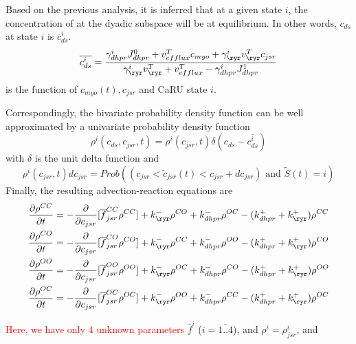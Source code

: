 Based on the previous analysis, it is inferred that at a given state
$i$, the concentration of  at the dyadic subspace will be at
equilibrium. In other words, $c_{ds}$ at state $i$ is
$\overline{c}^i_{ds}$. 
\begin{equation}
  \label{eq:223}
  \overline{c^i_{ds}} =
  \frac{\gamma^i_{dhpr}J^0_{dhpr}+v^T_{efflux}c_{myo}+\gamma^i_\ryr v^T_\ryr
    c_{jsr}}{\gamma^i_\ryr v^T_\ryr + v^T_{efflux}
    - \gamma^i_{dhpr}J^1_{dhpr}}
\end{equation}
is the function of $c_{myo}(t), c_{jsr}$ and CaRU state $i$.

Correspondingly, the bivariate probability density function can be
well approximated by a univariate probability density function
\begin{equation}
  \label{eq:222}
  \rho^i(c_{ds},c_{jsr},t) = \rho^i(c_{jsr},t)\delta(c_{ds}-\overline{c^i_{ds}})
\end{equation}
with $\delta$ is the unit delta function and
\begin{equation}
  \label{eq:224}
  \rho^i(c_{jsr},t) dc_{jsr} =  Prob \left((c_{jsr}<\tilde{c}_{jsr}(t) <
    c_{jsr} + dc_{jsr}) \text{ and } \tilde{S}(t)=i \right)
\end{equation}
Finally, the resulting advection-reaction equations are
\begin{equation}
  \label{eq:225}
  \begin{split}
    \frac{\partial \rho^{CC}}{\partial t} &=   -\frac{\partial}{\partial
      c_{jsr}}[\overline{f}^{CC}_{jsr}\rho^{CC}] + k^-_\ryr\rho^{CO} + k^-_{dhpr} \rho^{OC} - (k^+_{dhpr}+k^+_\ryr)\rho^{CC} \\ 
    \frac{\partial \rho^{CO}}{\partial t} &=  -\frac{\partial}{\partial
      c_{jsr}}[\overline{f}^{CO}_{jsr}\rho^{CO}] + k^-_\ryr\rho^{CC} + k^-_{dhpr}
    \rho^{OO} - (k^+_{dhpr}+k^+_\ryr) \rho^{CO} \\
    \frac{\partial \rho^{OO}}{\partial t} &= -\frac{\partial}{\partial
      c_{jsr}}[\overline{f}^{OO}_{jsr}\rho^{OO}] + k^-_\ryr\rho^{OC} + k^-_{dhpr}
    \rho^{CO} - (k^+_{dhpr}+k^+_\ryr) \rho^{OO}   \\
    \frac{\partial \rho^{OC}}{\partial t} &=  -\frac{\partial}{\partial
      c_{jsr}}[\overline{f}^{OC}_{jsr}\rho^{OC}] + k^-_\ryr\rho^{OO} + k^-_{dhpr}
    \rho^{CC} - (k^+_{dhpr}+k^+_\ryr) \rho^{OC}  
  \end{split}
\end{equation}

\textcolor{red}{Here, we have only 4 unknown parameters} 
$\overline{f}^i$ ($i=\overline{1..4}$), and $\rho^i= \rho^i_{jsr}$, and

